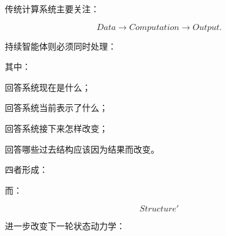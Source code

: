 传统计算系统主要关注：

\[
Data
\rightarrow
Computation
\rightarrow
Output.
\]

持续智能体则必须同时处理：

\begin{statementbox}
\centering
{}
\end{statementbox}

其中：

\begin{statementbox}
\centering
{}
\end{statementbox}

回答系统现在是什么；

\begin{statementbox}
\centering
{}
\end{statementbox}

回答系统当前表示了什么；

\begin{statementbox}
\centering
{}
\end{statementbox}

回答系统接下来怎样改变；

\begin{statementbox}
\centering
{}
\end{statementbox}

回答哪些过去结构应该因为结果而改变。

四者形成：

\begin{statementbox}
\centering
{}
\end{statementbox}

而：

\[
Structure'
\]

进一步改变下一轮状态动力学：

\begin{statementbox}
\centering
{}
\end{statementbox}

